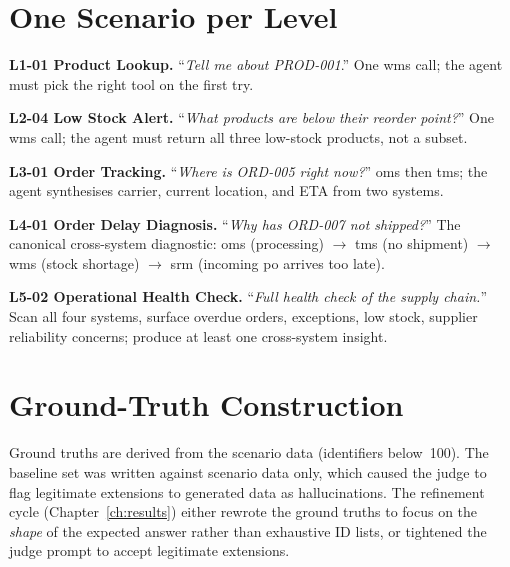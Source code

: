 \section{One Scenario per Level}

\textbf{L1-01 Product Lookup.} ``\emph{Tell me about PROD-001}.'' One \gls{wms} call; the agent must pick the right tool on the first try.

\textbf{L2-04 Low Stock Alert.} ``\emph{What products are below their reorder point?}'' One \gls{wms} call; the agent must return all three low-stock products, not a subset.

\textbf{L3-01 Order Tracking.} ``\emph{Where is ORD-005 right now?}'' \gls{oms} then \gls{tms}; the agent synthesises carrier, current location, and ETA from two systems.

\textbf{L4-01 Order Delay Diagnosis.} ``\emph{Why has ORD-007 not shipped?}'' The canonical cross-system diagnostic: \gls{oms} (processing) $\to$ \gls{tms} (no shipment) $\to$ \gls{wms} (stock shortage) $\to$ \gls{srm} (incoming \gls{po} arrives too late).

\textbf{L5-02 Operational Health Check.} ``\emph{Full health check of the supply chain.}'' Scan all four systems, surface overdue orders, exceptions, low stock, supplier reliability concerns; produce at least one cross-system insight.

\section{Ground-Truth Construction}

Ground truths are derived from the scenario data (identifiers below~100). The baseline set was written against scenario data only, which caused the judge to flag legitimate extensions to generated data as hallucinations. The refinement cycle (Chapter~\ref{ch:results}) either rewrote the ground truths to focus on the \emph{shape} of the expected answer rather than exhaustive ID lists, or tightened the judge prompt to accept legitimate extensions.
